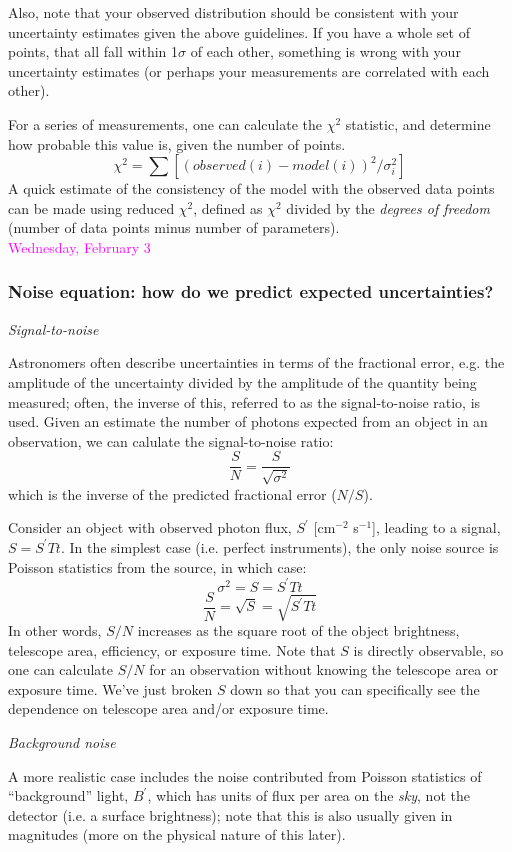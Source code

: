 \documentclass[12pt]{article}
\begin{document}
Also, note that your observed distribution should be
consistent with your uncertainty estimates given the above guidelines.
If you have a whole set of points, that all fall within 1$\sigma$ of
each other, something is wrong with your uncertainty estimates (or
perhaps your measurements are correlated with each other).

For a series of measurements, one can calculate the
$\chi^{2}$ statistic, and determine how probable this value is,
given the number of points.
    $$ \chi^2 = \sum [(observed(i)-model(i))^2/\sigma_i^2]  $$
A quick estimate of the consistency of the model with the observed
data points can be made using reduced $\chi^{2}$, defined as
$\chi^{2}$ divided by the \emph{degrees of freedom} (number of data points
minus number of parameters).\\

\textcolor{magenta}{Wednesday, February 3}
\subsubsection*{Noise equation: how do we predict expected
uncertainties?}
\emph{Signal-to-noise}

Astronomers often describe uncertainties in terms of the fractional
error, e.g. the amplitude of the uncertainty divided by the amplitude
of the quantity being measured; often, the inverse of this, referred
to as the signal-to-noise ratio, is used. Given an estimate the number
of photons expected from an object in an observation, we can calulate
the signal-to-noise ratio:
    $$ \frac{S}{N} = \frac{S}{\sqrt{\sigma^2}} $$
which is the inverse of the predicted fractional error ($N/S$).

Consider an object with observed photon flux, $S^{\prime}$
[cm$^{-2}$ s$^{-1}$],
leading to a signal, $S = S^{\prime}Tt$.
In the simplest case (i.e. perfect
instruments), the only noise
source is Poisson statistics from the source, in which case:
    $$ \sigma^2 = S = S^{\prime}Tt $$
    $$ \frac{S}{N} = \sqrt{S} = \sqrt{S^{\prime}Tt} $$
In other words, $S/N$ increases as the square root of the object
brightness, telescope area, efficiency, or exposure time. Note that $S$
is directly observable, so one can calculate $S/N$ for an
observation without knowing the telescope area or exposure time.
We've just broken $S$ down so that you can specifically see the dependence on
telescope area and/or exposure time.

\emph{Background noise}

A more realistic case includes the noise contributed from Poisson
statistics of ``background'' light, $B^{\prime}$,
which has units of flux per area
on the \emph{sky}, not the detector
(i.e. a surface brightness); note that this is also usually
given in magnitudes (more on the physical nature of
this later).
\end{document}
